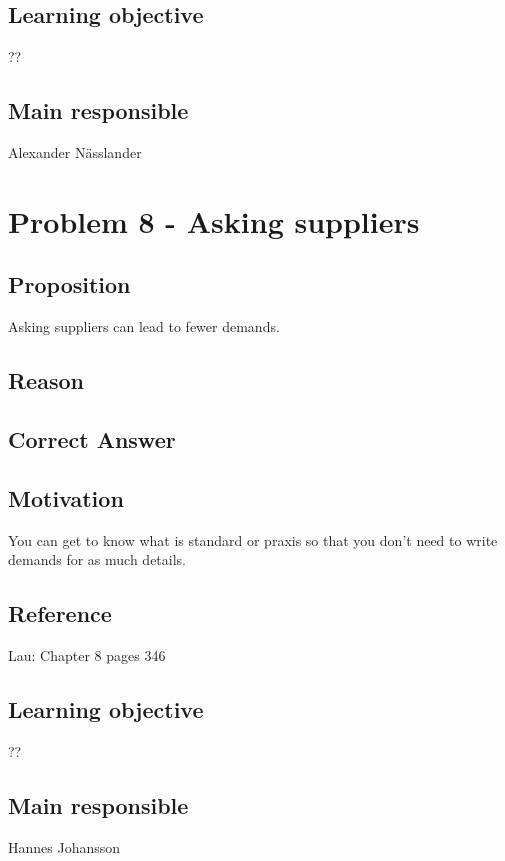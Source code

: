 \documentclass[a4paper]{article}
\begin{document}
\subsection{Learning objective}
??
\subsection{Main responsible}
Alexander Nässlander

\section{Problem 8 - Asking suppliers}
\subsection{Proposition}
Asking suppliers can lead to fewer demands.
\subsection{Reason}

\subsection{Correct Answer}

\subsection{Motivation}
You can get to know what is standard or praxis so that you don't need to write demands for as much details.

\subsection{Reference}
Lau: Chapter 8 pages 346
\subsection{Learning objective}
??
\subsection{Main responsible}
Hannes Johansson
\end{document}
